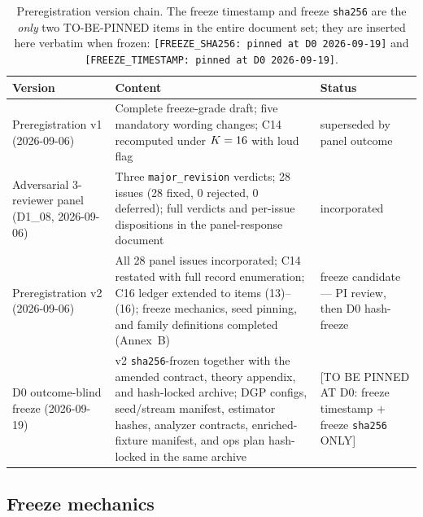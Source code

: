 \begin{table}[h]
\centering
\small
\begin{tabular}{p{4.6cm}p{7.6cm}p{2.6cm}}
\toprule
Version & Content & Status \\
\midrule
Preregistration v1 (2026-09-06) & Complete freeze-grade draft; five mandatory
wording changes; C14 recomputed under $K = 16$ with loud flag &
superseded by panel outcome \\
Adversarial 3-reviewer panel (D1\_08, 2026-09-06) & Three
\texttt{major\_revision} verdicts; 28 issues (28 fixed, 0 rejected, 0
deferred); full verdicts and per-issue dispositions in the panel-response
document & incorporated \\
Preregistration v2 (2026-09-06) & All 28 panel issues incorporated; C14
restated with full record enumeration; C16 ledger extended to items
(13)--(16); freeze mechanics, seed pinning, and family definitions completed
(Annex~B) & freeze candidate --- PI review, then D0 hash-freeze \\
D0 outcome-blind freeze (2026-09-19) & v2 \texttt{sha256}-frozen together
with the amended contract, theory appendix, and hash-locked archive;
DGP configs, seed/stream manifest, estimator hashes, analyzer contracts,
enriched-fixture manifest, and ops plan hash-locked in the same archive &
[TO BE PINNED AT D0: freeze timestamp $+$ freeze \texttt{sha256} ONLY] \\
\bottomrule
\end{tabular}
\caption{Preregistration version chain. The freeze timestamp and freeze
\texttt{sha256} are the \emph{only} two TO-BE-PINNED items in the entire
document set; they are inserted here verbatim when frozen:
\texttt{[FREEZE\_SHA256: pinned at D0 2026-09-19]} and
\texttt{[FREEZE\_TIMESTAMP: pinned at D0 2026-09-19]}.}
\label{tab:versionchain}
\end{table}

\subsection{Freeze mechanics}
\label{app:prereg-freeze}

